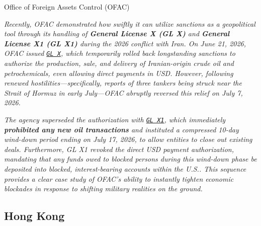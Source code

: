 \documentclass[10pt]{article}
\begin{document}
\begin{core}[label=core:ofac]{Office of Foreign Assets Control (OFAC)}
\begin{enumerate}
          \textit{Recently, OFAC demonstrated how swiftly it can utilize sanctions as a geopolitical tool through its handling of \textbf{General License X (GL X)} and \textbf{General License X1 (GL X1)} during the 2026 conflict with Iran. On June 21, 2026, OFAC issued \href{https://ofac.treasury.gov/recent-actions/20260622_33}{\texttt{GL X}}, which temporarily rolled back longstanding sanctions to authorize the production, sale, and delivery of Iranian-origin crude oil and petrochemicals, even allowing direct payments in USD. However, following renewed hostilities---specifically, reports of three tankers being struck near the Strait of Hormuz in early July---OFAC abruptly reversed this relief on July 7, 2026.}

          \textit{The agency superseded the authorization with \href{https://ofac.treasury.gov/recent-actions/20260707}{\texttt{GL X1}}, which immediately \textbf{prohibited any new oil transactions} and instituted a compressed 10-day wind-down period ending on July 17, 2026, to allow entities to close out existing deals. Furthermore, GL X1 revoked the direct USD payment authorization, mandating that any funds owed to blocked persons during this wind-down phase be deposited into blocked, interest-bearing accounts within the U.S.. This sequence provides a clear case study of OFAC's ability to instantly tighten economic blockades in response to shifting military realities on the ground.}

        \end{enumerate}

      \end{core}

  \subsection{Hong Kong}
\end{document}
